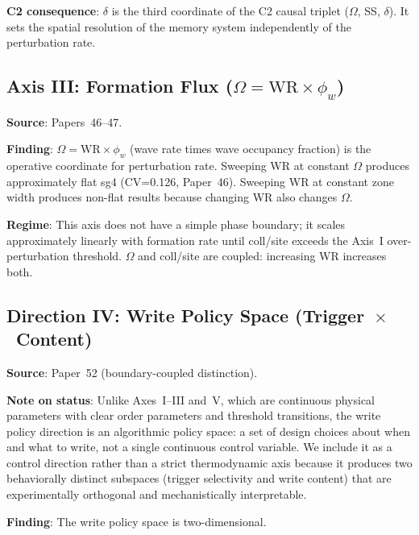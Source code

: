 \documentclass[11pt,a4paper]{article}
\begin{document}
\textbf{C2 consequence}: $\delta$ is the third coordinate of the C2 causal
triplet ($\Omega$, SS, $\delta$).
It sets the spatial resolution of the memory system independently of the
perturbation rate.

\subsection{Axis III: Formation Flux ($\Omega = \mathrm{WR} \times \phi_w$)}

\textbf{Source}: Papers~46--47.

\textbf{Finding}: $\Omega = \mathrm{WR} \times \phi_w$ (wave rate times wave
occupancy fraction) is the operative coordinate for perturbation rate.
Sweeping WR at constant $\Omega$ produces approximately flat sg4 (CV=0.126,
Paper~46).
Sweeping WR at constant zone width produces non-flat results because changing
WR also changes $\Omega$.

\textbf{Regime}: This axis does not have a simple phase boundary; it scales
approximately linearly with formation rate until coll/site exceeds the Axis~I
over-perturbation threshold.
$\Omega$ and coll/site are coupled: increasing WR increases both.

\subsection{Direction IV: Write Policy Space (Trigger~$\times$~Content)}
\label{subsec:axis4}

\textbf{Source}: Paper~52 (boundary-coupled distinction).

\textbf{Note on status}: Unlike Axes~I--III and~V, which are continuous
physical parameters with clear order parameters and threshold transitions,
the write policy direction is an algorithmic policy space: a set of design
choices about when and what to write, not a single continuous control variable.
We include it as a control direction rather than a strict thermodynamic axis
because it produces two behaviorally distinct subspaces (trigger selectivity
and write content) that are experimentally orthogonal and mechanistically
interpretable.

\textbf{Finding}: The write policy space is two-dimensional.
\end{document}
